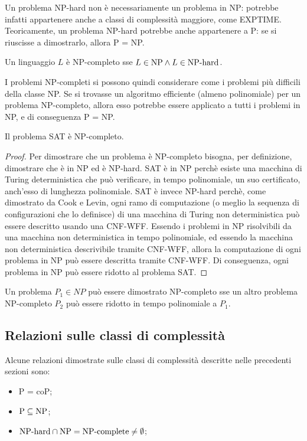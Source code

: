 Un problema NP-hard non è necessariamente un problema in NP: potrebbe infatti appartenere anche a classi di complessità maggiore, come EXPTIME. Teoricamente, un problema NP-hard potrebbe anche appartenere a P: se si riuscisse a dimostrarlo, allora P = NP.

\begin{defn}
    Un linguaggio $L$ è NP-completo sse $L \in \textnormal{NP} \land L \in \textnormal{NP-hard}$.
\end{defn}

I problemi NP-completi si possono quindi considerare come i problemi più difficili della classe NP.
Se si trovasse un algoritmo efficiente (almeno polinomiale) per un problema NP-completo, allora esso potrebbe essere applicato a tutti i problemi in NP, e di conseguenza P = NP.

\begin{thm}
    Il problema SAT è NP-completo.
\end{thm}
\begin{proof}
    Per dimostrare che un problema è NP-completo bisogna, per definizione, dimostrare che è in NP ed è NP-hard.
    SAT è in NP perchè esiste una macchina di Turing deterministica che può verificare, in tempo polinomiale, un suo certificato, anch'esso di lunghezza polinomiale.
    SAT è invece NP-hard perchè, come dimostrato da Cook e Levin, ogni ramo di computazione (o meglio la sequenza di configurazioni che lo definisce) di una macchina di Turing non deterministica può essere descritto usando una CNF-WFF.
    Essendo i problemi in NP risolvibili da una macchina non deterministica in tempo polinomiale, ed essendo la macchina non deterministica descrivibile tramite CNF-WFF, allora la computazione di ogni problema in NP può essere descritta tramite CNF-WFF.
    Di conseguenza, ogni problema in NP può essere ridotto al problema SAT.
\end{proof}

\begin{rem}
    Un problema $P_1 \in NP$ può essere dimostrato NP-completo sse un altro problema NP-completo $P_2$ può essere ridotto in tempo polinomiale a $P_1$.
\end{rem}

\subsection*{Relazioni sulle classi di complessità}
Alcune relazioni dimostrate sulle classi di complessità descritte nelle precedenti sezioni sono:
\begin{itemize}
    \item P = coP;
    \item $\textnormal{P} \subseteq \textnormal{NP}$;
    \item $\textnormal{NP-hard} \cap \textnormal{NP} = \textnormal{NP-complete} \neq \emptyset$;
\end{itemize}


